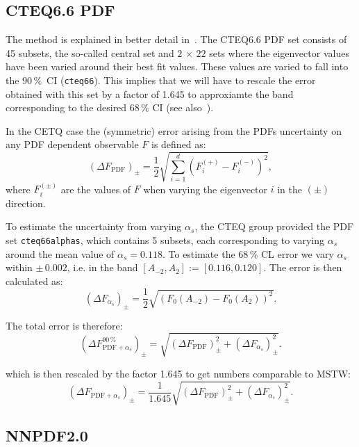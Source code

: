 \subsection*{CTEQ6.6 PDF}

The method is explained in better detail in~\cite{cteq66}. The CTEQ6.6 PDF set consists of 
45 subsets, the so-called central set and $2\,\times\, 22$ sets where the eigenvector values 
have been varied around their best fit values. These values are varied to fall into the $90\,\%$~CI 
({\tt cteq66}). This implies that we will have to rescale the error obtained with this set 
by a factor of 1.645 to approxiamte the band corresponding to the desired $68\,\%$ CI 
(see also~\cite{pdf4lhc}).

In the CETQ case the (symmetric) error arising from the PDFs uncertainty on any PDF dependent 
observable $F$ is defined as:
\begin{equation}
  \left(\Delta F_\mathrm{PDF}\right)_\pm = \frac{1}{2}
  \sqrt{\sum_{i=1}^{d}\left(F_i^{(+)}-F_i^{(-)}\right)^2},
\end{equation}
where $F_i^{(\pm)}$ are the values of $F$ when varying the eigenvector $i$ in the $(\pm)$ direction.

To estimate the uncertainty from varying $\alpha_s$, the CTEQ group provided the PDF set {\tt cteq66alphas}, 
which contains 5 subsets, each corresponding to varying $\alpha_s$ around the mean value of $\alpha_s=0.118$.
To estimate the $68\,\%$ CL error we vary $\alpha_s$ within $\pm\,0.002$, i.e. in the band 
$[A_{-2},A_{2}]:=[0.116,0.120]$. The error is then calculated as:
\begin{equation}
\left(\Delta F_{\alpha_s}\right)_{\pm}=\frac{1}{2}
\sqrt{\left(F_0(A_{-2}) - F_0(A_2)\right)^2}.
\end{equation}

The total error is therefore:
\begin{equation}
(\Delta F_{\mathrm{PDF}+\alpha_s}^{90\,\%})_\pm = \sqrt{ \left(\Delta F_\mathrm{PDF}\right)_\pm^2 + \left(\Delta F_{\alpha_s}\right)_{\pm}^2}.
\end{equation}

which is then rescaled by the factor 1.645 to get numbers comparable to MSTW:
\begin{equation}
(\Delta F_{\mathrm{PDF}+\alpha_s})_\pm = \frac{1}{1.645}\sqrt{ \left(\Delta F_\mathrm{PDF}\right)_\pm^2 + \left(\Delta F_{\alpha_s}\right)_{\pm}^2}.
\end{equation}

\subsection*{NNPDF2.0}

